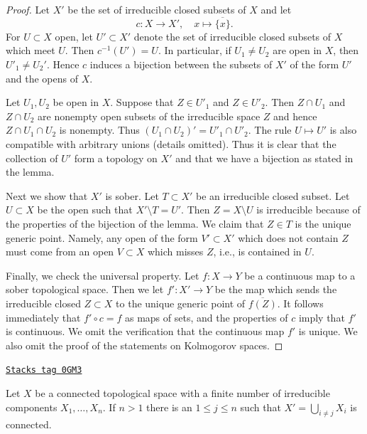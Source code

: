 \begin{proof}
Let $X'$ be the set of irreducible closed subsets of $X$ and let
$$
c : X \to X', \quad x \mapsto \overline{\{x\}}.
$$
For $U \subset X$ open, let $U' \subset X'$ denote the set
of irreducible closed subsets of $X$ which meet $U$.
Then $c^{-1}(U') = U$. In particular, if $U_1 \not = U_2$ are open in
$X$, then $U'_1 \not = U_2'$. Hence $c$ induces
a bijection between the subsets of $X'$ of the form $U'$ and the
opens of $X$.

\medskip\noindent
Let $U_1, U_2$ be open in $X$. Suppose that $Z \in U'_1$ and
$Z \in U'_2$. Then $Z \cap U_1$ and $Z \cap U_2$ are nonempty
open subsets of the irreducible space $Z$ and hence $Z \cap U_1 \cap U_2$
is nonempty. Thus $(U_1 \cap U_2)' = U'_1 \cap U'_2$.
The rule $U \mapsto U'$ is also compatible with arbitrary unions
(details omitted). Thus it is clear that the collection of
$U'$ form a topology on $X'$ and that we have a bijection as
stated in the lemma.

\medskip\noindent
Next we show that $X'$ is sober. Let $T \subset X'$ be an irreducible
closed subset. Let $U \subset X$ be the open such that $X' \setminus T = U'$.
Then $Z = X \setminus U$ is irreducible because of the properties
of the bijection of the lemma. We claim that $Z \in T$ is the unique generic
point. Namely, any open of the form $V' \subset X'$
which does not contain $Z$ must come from an open $V \subset X$
which misses $Z$, i.e., is contained in $U$.

\medskip\noindent
Finally, we check the universal property. Let $f : X \to Y$ be a continuous
map to a sober topological space. Then we let $f' : X' \to Y$ be the map
which sends the irreducible closed $Z \subset X$ to the unique generic
point of $\overline{f(Z)}$. It follows immediately that
$f' \circ c = f$ as maps of sets, and the properties of $c$ imply that
$f'$ is continuous. We omit the verification that the continuous
map $f'$ is unique. We also omit the proof of the statements on
Kolmogorov spaces.
\end{proof}

\begin{lemma}
\label{topology-lemma-remove-irreducible-connected}
\href{https://stacks.math.columbia.edu/tag/0GM3}{\texttt{Stacks tag 0GM3}}

Let $X$ be a connected topological space with a finite number of
irreducible components $X_1, \ldots, X_n$. If $n > 1$ there is an
$1 \leq j \leq n$ such that $X' = \bigcup_{i \not = j} X_i$ is connected.
\end{lemma}

